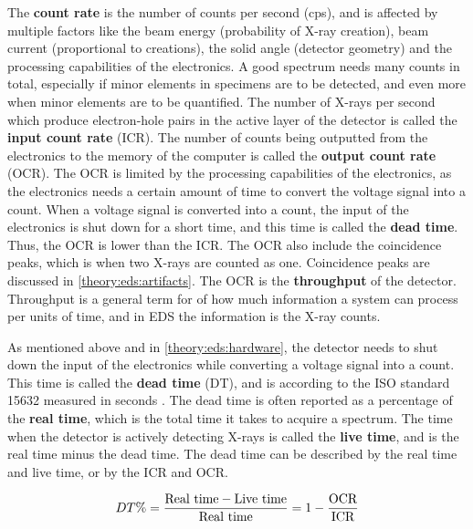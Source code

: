 The \textbf{count rate} is the number of counts per second (cps), and is affected by multiple factors like the beam energy (probability of X-ray creation), beam current (proportional to creations), the solid angle (detector geometry) and the processing capabilities of the electronics.
A good spectrum needs many counts in total, especially if minor elements in specimens are to be detected, and even more when minor elements are to be quantified.
The number of X-rays per second which produce electron-hole pairs in the active layer of the detector is called the \textbf{input count rate} (ICR).
The number of counts being outputted from the electronics to the memory of the computer is called the \textbf{output count rate} (OCR).
The OCR is limited by the processing capabilities of the electronics, as the electronics needs a certain amount of time to convert the voltage signal into a count.
When a voltage signal is converted into a count, the input of the electronics is shut down for a short time, and this time is called the \textbf{dead time}.
Thus, the OCR is lower than the ICR.
The OCR also include the coincidence peaks, which is when two X-rays are counted as one.
Coincidence peaks are discussed in \cref{theory:eds:artifacts}.
The OCR is the \textbf{throughput} of the detector.
Throughput is a general term for of how much information a system can process per units of time, and in EDS the information is the X-ray counts.



As mentioned above and in \cref{theory:eds:hardware}, the detector needs to shut down the input of the electronics while converting a voltage signal into a count.
This time is called the \textbf{dead time} (DT), and is according to the ISO standard 15632 measured in seconds \cite{iso_qc_15632}.
The dead time is often reported as a percentage of the \textbf{real time}, which is the total time it takes to acquire a spectrum.
The time when the detector is actively detecting X-rays is called the \textbf{live time}, and is the real time minus the dead time.
The dead time can be described by the real time and live time, or by the ICR and OCR.

\begin{equation}
    \label{eq:dead_time}
    DT \% = \frac{\textnormal{Real time} - \textnormal{Live time}}{\textnormal{Real time}} = 1 - \frac{\textnormal{OCR}}{\textnormal{ICR}}
\end{equation}

